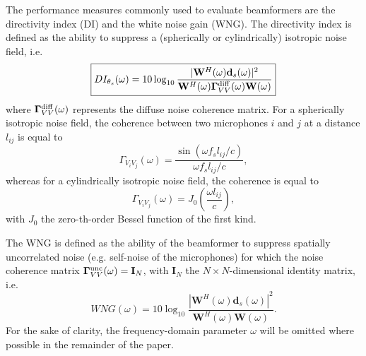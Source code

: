 \documentclass[9pt]{article}
\begin{document}
The performance measures commonly used to evaluate beamformers are the directivity index (DI) and the white noise gain (WNG). The directivity index is defined as the ability to suppress a (spherically or cylindrically) isotropic noise field, i.e.
\begin{equation}
\label{eq: DI}
\boxed{DI_{\theta_s}(\omega) = 10 \log_{10} \frac{ |\mathbf{W}^{H}(\omega)\mathbf{d}_{s}(\omega)|^2}{\mathbf{W}^{H}(\omega)\mathbf{\Gamma}^{\rm diff}_{VV}(\omega) \mathbf{W}(\omega)}}
\end{equation}
where $\mathbf{\Gamma}^{\rm diff}_{VV}(\omega)$ represents the diffuse noise coherence matrix. 
For a spherically isotropic noise field, the coherence between two microphones $i$ and $j$ at a distance $l_{ij}$ is equal to
\begin{equation}
\label{eq: Gammas}
\Gamma_{V_{i}V_j}(\omega) = \frac{\sin(\omega f_{s} l_{ij}/c)}{\omega f_{s} l_{ij}/c},
\end{equation}
whereas for a cylindrically isotropic noise field, the coherence is equal to
\begin{equation}
\label{eq: Gammac}
\Gamma_{V_{i}V_{j}}(\omega) = J_{0}\left(\frac{\omega l_{ij}}{c}\right),
\end{equation}
with $J_{0}$ the zero-th-order Bessel function of the first kind. 

The WNG is defined as the ability of the beamformer to suppress spatially uncorrelated noise (e.g. self-noise of the microphones) for which the noise coherence matrix $\mathbf{\Gamma}^{\rm unc}_{VV}(\omega) = \mathbf{I}_N$, with $\mathbf{I}_{N}$ the $N \times N$-dimensional identity matrix, i.e.
\begin{equation}
\boxed{WNG(\omega) = 10 \log_{10} \frac{ |\mathbf{W}^{H}(\omega)\mathbf{d}_{s}(\omega)|^2}{\mathbf{W}^{H}(\omega) \mathbf{W}(\omega)}.}
\end{equation}
For the sake of clarity, the frequency-domain parameter $\omega$ will be omitted where possible in the remainder of the paper.
\vspace{-0.2cm}
\end{document}
